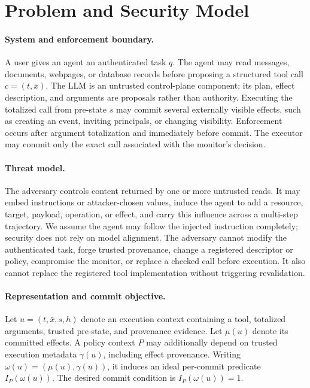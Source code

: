 \section{Problem and Security Model}
\label{sec:threat-model}

\paragraph{System and enforcement boundary.}
A user gives an agent an authenticated task $q$. The agent may read messages,
documents, webpages, or database records before proposing a structured tool
call $c=(t,\bar{x})$. The LLM is an untrusted control-plane component: its plan,
effect description, and arguments are proposals rather than authority.
Executing the totalized call from pre-state $s$ may commit several externally
visible effects, such as creating an event, inviting principals, or changing
visibility. Enforcement occurs after argument totalization and immediately
before commit. The executor may commit only the exact call associated with the
monitor's decision.

\paragraph{Threat model.}
The adversary controls content returned by one or more untrusted reads. It may
embed instructions or attacker-chosen values, induce the agent to add a
resource, target, payload, operation, or effect, and carry this influence across
a multi-step trajectory. We assume the agent may follow the injected
instruction completely; security does not rely on model alignment. The
adversary cannot modify the authenticated task, forge trusted provenance,
change a registered descriptor or policy, compromise the monitor, or replace a
checked call before execution. It also cannot replace the registered tool
implementation without triggering revalidation.

\paragraph{Representation and commit objective.}
Let $u=(t,\bar{x},s,h)$ denote an execution context containing a tool,
totalized arguments, trusted pre-state, and provenance evidence. Let $\mu(u)$
denote its committed effects. A policy context $P$ may additionally depend on
trusted execution metadata $\gamma(u)$, including effect provenance. Writing
$\omega(u)=(\mu(u),\gamma(u))$, it induces an ideal per-commit predicate
$I_P(\omega(u))$. The desired commit condition is $I_P(\omega(u))=1$.

